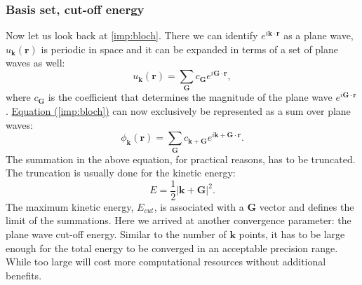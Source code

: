 \subsubsection{Basis set, cut-off energy }
Now let us look back at \autoref{imp:bloch}. There we can identify $e^{i\mathbf{k}\cdot\mathbf{r}}$ as a plane wave, $u_{\mathbf{k}}(\mathbf{r})$ is periodic in space and it can be expanded in terms of a set of plane waves as well:
\begin{equation}
u_{\mathbf{k}}(\mathbf{r})=\sum_{\mathbf{G}}c_{\mathbf{G}}e^{i\mathbf{G}\cdot\mathbf{r}},
\end{equation}
where $c_{\mathbf{G}}$ is the coefficient that determines the magnitude of the plane wave $e^{i\mathbf{G}\cdot\mathbf{r}}$. \hyperref[imp:bloch]{Equation (\ref*{imp:bloch})} can now exclusively be represented as a sum over plane waves:
\begin{equation}
\phi_{\mathbf{k}}(\mathbf{r})=\sum_{\mathbf{G}}c_{\mathbf{k+G}}e^{i\mathbf{k+G}\cdot\mathbf{r}}.
\end{equation}
The summation in the above equation, for practical reasons, has to be truncated. The truncation is usually done for the kinetic energy:
\begin{equation}
E=\frac{1}{2}|\mathbf{k+G}|^2.
\end{equation}
The maximum kinetic energy, $E_{cut}$, is associated with a $\mathbf{G}$ vector and defines the limit of the summations. Here we arrived at another convergence parameter: the plane wave cut-off energy. Similar to the number of $\mathbf{k}$ points, it has to be large enough for the total energy to be converged in an acceptable precision range.  While too large will cost more computational resources without additional benefits.
